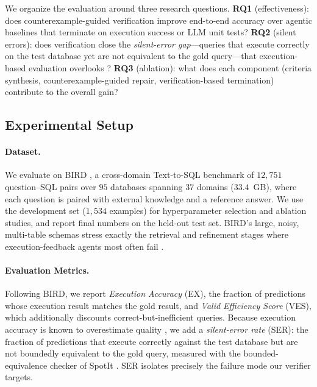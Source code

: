 \documentclass{article}
\begin{document}
We organize the evaluation around three research questions. \textbf{RQ1}
(effectiveness): does counterexample-guided verification improve end-to-end
accuracy over agentic baselines that terminate on execution success or LLM unit
tests? \textbf{RQ2} (silent errors): does verification close the
\emph{silent-error gap}---queries that execute correctly on the test database
yet are not equivalent to the gold query---that execution-based evaluation
overlooks \cite{klopfenstein2026spotit}? \textbf{RQ3} (ablation): what does each
component (criteria synthesis, counterexample-guided repair, verification-based
termination) contribute to the overall gain?

\subsection{Experimental Setup}

\paragraph{Dataset.} We evaluate on BIRD \cite{li2023bird}, a cross-domain
Text-to-SQL benchmark of $12{,}751$ question--SQL pairs over $95$ databases
spanning $37$ domains ($33.4$~GB), where each question is paired with external
knowledge and a reference answer. We use the development set ($1{,}534$ examples)
for hyperparameter selection and ablation studies, and report final numbers on
the held-out test set. BIRD's large, noisy, multi-table schemas stress exactly
the retrieval and refinement stages where execution-feedback agents most often
fail \cite{wang2023macsql}.

\paragraph{Evaluation Metrics.} Following BIRD, we report \emph{Execution
Accuracy} (EX), the fraction of predictions whose execution result matches the
gold result, and \emph{Valid Efficiency Score} (VES), which additionally
discounts correct-but-inefficient queries. Because execution accuracy is known
to overestimate quality \cite{ren_purple_2024}, we add a \emph{silent-error
rate} (SER): the fraction of predictions that execute correctly against the test
database but are not boundedly equivalent to the gold query, measured with the
bounded-equivalence checker of SpotIt \cite{klopfenstein2026spotit}. SER isolates
precisely the failure mode our verifier targets.
\end{document}
